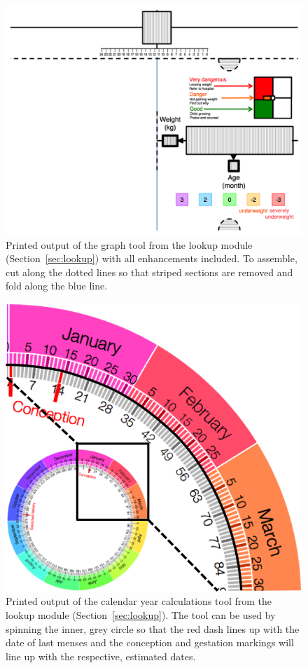 \documentclass{sig-alternate}
\begin{document}
\begin{figure}
\centering
\includegraphics[width=\linewidth]{img/graph-print.png}
\caption{Printed output of the graph tool from the lookup module (Section~\ref{sec:lookup}) with all enhancements included. To assemble, cut along the dotted lines so that striped sections are removed and fold along the blue line.}
\label{fig:graph-print}
\end{figure}

\begin{figure}
\centering
\includegraphics[width=.6\linewidth]{img/circletool.png}
\caption{Printed output of the calendar year calculations tool from the lookup module (Section~\ref{sec:lookup}). The tool can be used by spinning the inner, grey circle so that the red dash lines up with the date of last menses and the conception and gestation markings will line up with the respective, estimated dates.}
\label{fig:circletool}
\end{figure}
\end{document}
